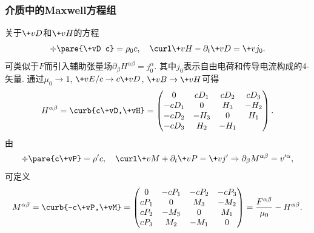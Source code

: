 \documentclass[hidelinks]{ctexart}
\begin{document}

\subsubsection{介质中的Maxwell方程组} %
 
关于$\+vD$和$\+vH$的方程
\[ \div \pare{\+vD c} = \rho_0 c,\quad \curl \+vH - \partial_t \+vD = \+vj_0. \]
可类似于$F$而引入辅助张量场$\partial_\beta H^{\alpha\beta} = j_0^\alpha$. 其中$j_0$表示自由电荷和传导电流构成的4-矢量. 通过$\mu_0 \rightarrow 1$, $\+vE/c\rightarrow c\+vD$, $\+vB \rightarrow \+vH$可得
\[ H^{\alpha\beta} = \curb{c\+vD,\+vH} = \begin{pmatrix}
    0 & cD_1 & cD_2 & cD_3 \\
    -cD_1 & 0 & H_3 & -H_2 \\
    -cD_2 & -H_3 & 0 & H_1 \\
    -cD_3 & H_2 & -H_1
\end{pmatrix}. \]
由
\[ \div \pare{c\+vP} = \rho' c,\quad \curl \+vM + \partial_t \+vP = \+vj' \Rightarrow \partial_\beta M^{\alpha\beta} = v'^\alpha, \]
可定义
\[ M^{\alpha\beta} = \curb{-c\+vP,\+vM} = \begin{pmatrix}
    0 & -cP_1 & -cP_2 & -cP_3 \\
    cP_1 & 0 & M_3 & -M_2 \\
    cP_2 & -M_3 & 0 & M_1 \\
    cP_3 & M_2 & -M_1 & 0
\end{pmatrix} = \frac{F^{\alpha\beta}}{\mu_0} - H^{\alpha\beta}. \]
\end{document}
